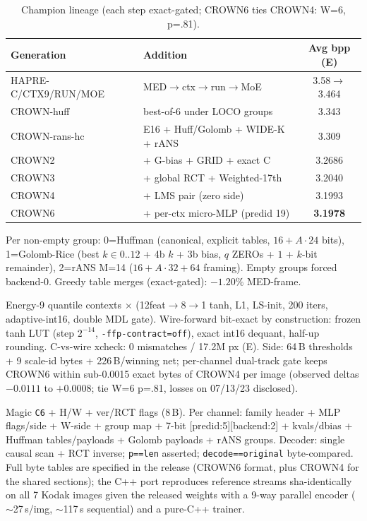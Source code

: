 \documentclass[smallabstract,smallcaptions]{dccpaper}
\begin{document}
\begin{table}[h]
\centering\small
\caption{Champion lineage (each step exact-gated; CROWN6 ties CROWN4: W=6, p=.81).}
\label{tab:lineage}
\begin{tabular}{@{}lp{2.7in}c@{}}
\toprule
Generation & Addition & Avg bpp (E) \\
\midrule
HAPRE-C/CTX9/RUN/MOE & MED$\to$ctx$\to$run$\to$MoE & 3.58$\to$3.464 \\
CROWN-huff & best-of-6 under LOCO groups & 3.343 \\
CROWN-rans-hc & E16 + Huff/Golomb + WIDE-K + rANS & 3.309 \\
CROWN2 & + G-bias + GRID + exact C & 3.2686 \\
CROWN3 & + global RCT + Weighted-17th & 3.2040 \\
CROWN4 & + LMS pair (zero side) & 3.1993 \\
CROWN6 & + per-ctx micro-MLP (predid 19) & \textbf{3.1978} \\
\bottomrule
\end{tabular}
\end{table}

Per non-empty group: 0=Huffman (canonical, explicit tables, $16+A\cdot24$
bits), 1=Golomb-Rice (best $k\in0..12$ + 4b $k$ + 3b bias, $q$ ZEROs + $1$ +
$k$-bit remainder), 2=rANS M=14 ($16+A\cdot32+64$ framing). Empty groups
forced backend-0. Greedy table merges (exact-gated): $-1.20\%$ MED-frame.

Energy-9 quantile contexts $\times$ (12feat$\to$8$\to$1 tanh, L1, LS-init,
200 iters, adaptive-int16, double MDL gate).
Wire-forward bit-exact by construction: frozen tanh LUT (step $2^{-14}$,
\texttt{-ffp-contract=off}), exact int16 dequant, half-up rounding. C-vs-wire
xcheck: 0 mismatches / 17.2M px (E). Side: 64\,B thresholds + 9 scale-id
bytes + 226\,B/winning net; per-channel dual-track gate keeps CROWN6 within
sub-0.0015 exact bytes of CROWN4 per image (observed deltas $-0.0111$ to
$+0.0008$; tie W=6 p=.81, losses on 07/13/23 disclosed).

Magic \texttt{C6} + H/W + ver/RCT flags (8\,B). Per channel: family header +
MLP flags/side + W-side + group map + 7-bit [predid:5][backend:2] +
kvals/dbias + Huffman tables/payloads + Golomb payloads + rANS groups.
Decoder: single causal scan + RCT inverse; \texttt{p==len} asserted;
\texttt{decode==original} byte-compared. Full byte tables are specified in
the release (CROWN6 format, plus CROWN4 for the shared sections);
the C++ port reproduces reference streams sha-identically on all
7 Kodak images given the released weights with a 9-way parallel encoder ($\sim$27\,s/img, $\sim$117\,s
sequential) and a pure-C++ trainer.
\end{document}

